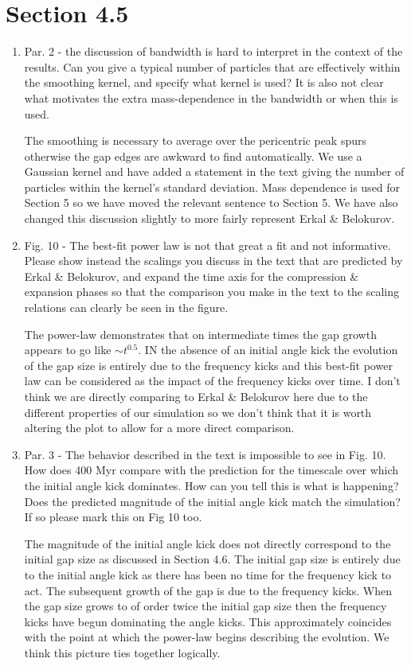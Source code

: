 \documentclass{article}
\begin{document}
\section{Section 4.5}
\begin{enumerate}
\item Par. 2 - the discussion of bandwidth is hard to interpret in the context of the results. Can
you give a typical number of particles that are effectively within the smoothing kernel,
and specify what kernel is used? It is also not clear what motivates the extra
mass-dependence in the bandwidth or when this is used.

{\color{red} The smoothing is necessary to average over the pericentric peak spurs otherwise the gap edges are awkward to find automatically. We use a Gaussian kernel and have added a statement in the text giving the number of particles within the kernel's standard deviation. Mass dependence is used for Section 5 so we have moved the relevant sentence to Section 5. We have also changed this discussion slightly to more fairly represent Erkal \& Belokurov.}

\item Fig. 10 - The best-fit power law is not that great a fit and not informative. Please show
instead the scalings you discuss in the text that are predicted by Erkal \& Belokurov, and
expand the time axis for the compression \& expansion phases so that the comparison
you make in the text to the scaling relations can clearly be seen in the figure.

{\color{red} The power-law demonstrates that on intermediate times the gap growth appears to go like $\sim t^{0.5}$. IN the absence of an initial angle kick the evolution of the gap size is entirely due to the frequency kicks and this best-fit power law can be considered as the impact of the frequency kicks over time. I don't think we are directly comparing to Erkal \& Belokurov here due to the different properties of our simulation so we don't think that it is worth altering the plot to allow for a more direct comparison.}


\item Par. 3 - The behavior described in the text is impossible to see in Fig. 10. How does 400
Myr compare with the prediction for the timescale over which the initial angle kick
dominates. How can you tell this is what is happening? Does the predicted magnitude of
the initial angle kick match the simulation? If so please mark this on Fig 10 too.

{\color{red} The magnitude of the initial angle kick does not directly correspond to the initial gap size as discussed in Section 4.6. The initial gap size is entirely due to the initial angle kick as there has been no time for the frequency kick to act. The subsequent growth of the gap is due to the frequency kicks. When the gap size grows to of order twice the initial gap size then the frequency kicks have begun dominating the angle kicks. This approximately coincides with the point at which the power-law begins describing the evolution. We think this picture ties together logically.}


\end{enumerate}
\end{document}
